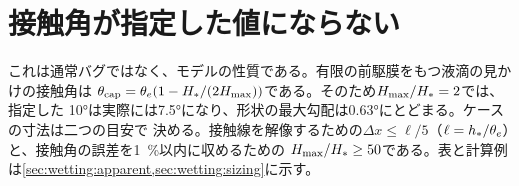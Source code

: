 \section{接触角が指定した値にならない}
\label{sec:trouble:angle}

これは通常バグではなく、モデルの性質である。有限の前駆膜をもつ液滴の見かけの接触角は
$\theta_{\mathrm{cap}} = \theta_{e}(1 - H_{*}/(2H_{\mathrm{max}}))$である。そのため$H_{\mathrm{max}}/H_{*} = 2$では、指定した
\ang{10}は実際には\ang{7.5}になり、形状の最大勾配は\ang{0.63}にとどまる。ケースの寸法は二つの目安で
決める。接触線を解像するための$\Delta x
\le \ell/5$（$\ell = h_{*}/\theta_{e}$）と、接触角の誤差を\SI{1}{\percent}以内に収めるための
$H_{\mathrm{max}}/H_{*} \ge 50$である。表と計算例は\cref{sec:wetting:apparent,sec:wetting:sizing}に示す。
